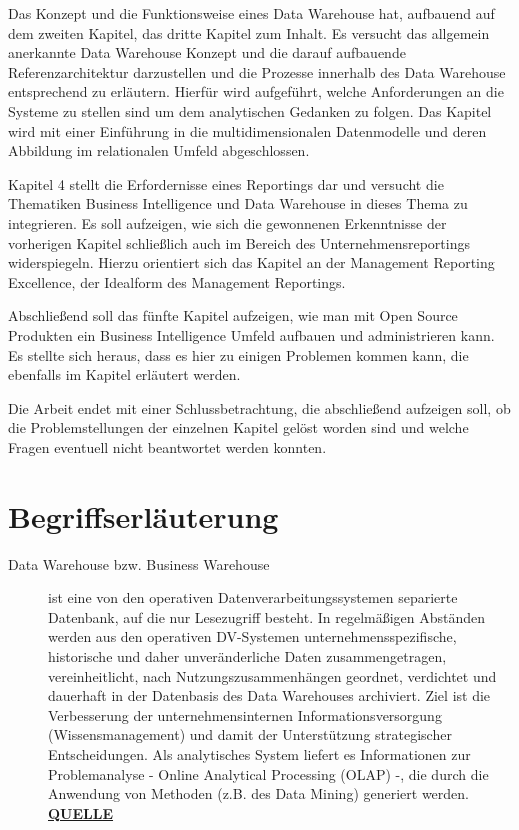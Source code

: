 Das Konzept und die Funktionsweise eines Data Warehouse hat, aufbauend auf dem zweiten Kapitel, das dritte Kapitel zum Inhalt. Es versucht das allgemein anerkannte Data Warehouse Konzept und die darauf aufbauende Referenzarchitektur darzustellen und die Prozesse innerhalb des Data Warehouse entsprechend zu erläutern. Hierfür wird aufgeführt, welche Anforderungen an die Systeme zu stellen sind um dem analytischen Gedanken zu folgen. Das Kapitel wird mit einer Einführung in die multidimensionalen Datenmodelle und deren Abbildung im relationalen Umfeld abgeschlossen.
 
Kapitel 4 stellt die Erfordernisse eines Reportings dar und versucht die Thematiken Business Intelligence und Data Warehouse in dieses Thema zu integrieren. Es soll aufzeigen, wie sich die gewonnenen Erkenntnisse der vorherigen Kapitel schließlich auch im Bereich des Unternehmensreportings widerspiegeln. Hierzu orientiert sich das Kapitel an der Management Reporting Excellence, der Idealform des Management Reportings.
 
Abschließend soll das fünfte Kapitel aufzeigen, wie man mit Open Source Produkten ein Business Intelligence Umfeld aufbauen und administrieren kann. Es stellte sich heraus, dass es hier zu einigen Problemen kommen kann, die ebenfalls im Kapitel erläutert werden.
 
Die Arbeit endet mit einer Schlussbetrachtung, die abschließend aufzeigen soll, ob die Problemstellungen der einzelnen Kapitel gelöst worden sind und welche Fragen eventuell nicht beantwortet werden konnten.



\chapter{Begriffserläuterung}
\begin{description}
	\item [Data Warehouse bzw. Business Warehouse] ist eine von den operativen Datenverarbeitungssystemen separierte Datenbank, auf die nur Lesezugriff besteht. In regelmäßigen Abständen werden aus den operativen DV-Systemen unternehmensspezifische, historische und daher unveränderliche Daten zusammengetragen, vereinheitlicht, nach Nutzungszusammenhängen geordnet, verdichtet und dauerhaft in der Datenbasis des Data Warehouses archiviert. Ziel ist die Verbesserung der unternehmensinternen Informationsversorgung (Wissensmanagement) und damit der Unterstützung strategischer Entscheidungen. Als analytisches System liefert es Informationen zur Problemanalyse - Online Analytical Processing (OLAP) -, die durch die Anwendung von Methoden (z.B. des Data Mining) generiert werden.  \href{http://wirtschaftslexikon.gabler.de/Definition/data-warehouse.html?referenceKeywordName=Business+Warehouse}{\textbf{QUELLE}}
\end{description}




